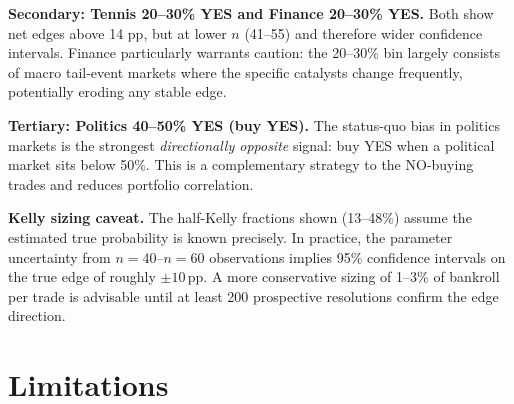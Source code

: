 \documentclass[11pt,a4paper]{article}
\begin{document}
\textbf{Secondary: Tennis 20--30\% YES and Finance 20--30\% YES.}
Both show net edges above 14 pp, but at lower $n$ (41--55) and therefore
wider confidence intervals.
Finance particularly warrants caution: the 20--30\% bin largely consists of
macro tail-event markets where the specific catalysts change frequently,
potentially eroding any stable edge.

\textbf{Tertiary: Politics 40--50\% YES (buy YES).}
The status-quo bias in politics markets is the strongest \emph{directionally
opposite} signal: buy YES when a political market sits below 50\%.
This is a complementary strategy to the NO-buying trades and reduces
portfolio correlation.

\textbf{Kelly sizing caveat.}
The half-Kelly fractions shown (13--48\%) assume the estimated true probability
is known precisely.
In practice, the parameter uncertainty from $n=40$--$n=60$ observations
implies 95\% confidence intervals on the true edge of roughly $\pm 10\,\mathrm{pp}$.
A more conservative sizing of 1--3\% of bankroll per trade is advisable until
at least 200 prospective resolutions confirm the edge direction.

\section{Limitations}
\end{document}
